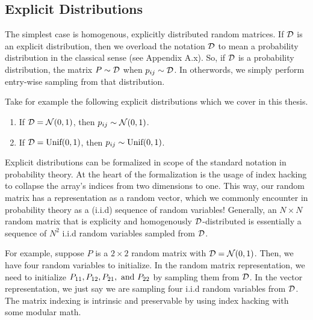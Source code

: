 
\subsection{Explicit Distributions}

The simplest case is homogenous, explicitly distributed random matrices. If $\mathcal{D}$ is an explicit distribution, then we overload the notation $\mathcal{D}$ to mean a probability distribution in the classical sense (see Appendix A.x). So, if $\mathcal{D}$ is a probability distribution, the matrix $P \sim \mathcal{D}$ when $p_{ij} \sim \mathcal{D}$. In otherwords, we simply perform entry-wise sampling from that distribution.

Take for example the following explicit distributions which we cover in this thesis.

\begin{enumerate}
\item  If $\mathcal{D} = \mathcal{N}(0,1)$, then $p_{ij} \sim \mathcal{N}(0,1)$.
\item  If $\mathcal{D} = \text{Unif}(0,1)$, then $p_{ij} \sim \text{Unif}(0,1)$.
\end{enumerate}

\begin{remark}[Formalization]
Explicit distributions can be formalized in scope of the standard notation in probability theory. At the heart of the formalization is the usage of index hacking to collapse the array's indices from two dimensions to one. This way, our random matrix has a representation as a random vector, which we commonly encounter in probability theory as a (i.i.d) sequence of random variables! Generally, an $N \times N$ random matrix that is explicity and homogenously $\mathcal{D}$-distributed is essentially a sequence of $N^2$ i.i.d random variables sampled from $\mathcal{D}$.
\end{remark}

\begin{example}[Formalization]
For example, suppose $P$ is a $2 \times 2$ random matrix with $\mathcal{D} = \mathcal{N}(0,1)$. Then, we have four random variables to initialize. In the random matrix representation, we need to initialize $P_{11}, P_{12}, P_{21}, \text{ and } P_{22}$ by sampling them from $\mathcal{D}$. In the vector representation, we just say we are sampling four i.i.d random variables from $\mathcal{D}$. The matrix indexing is intrinsic and preservable by using index hacking with some modular math.
\end{example}

